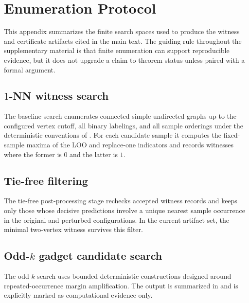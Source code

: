 \section{Enumeration Protocol}
\label{sec:enumeration-protocol}

This appendix summarizes the finite search spaces used to produce the witness
and certificate artifacts cited in the main text. The guiding rule throughout
the supplementary material is that finite enumeration can support reproducible evidence, but
it does not upgrade a claim to theorem status unless paired with a formal
argument.

\subsection[1-NN witness search]{$1$-NN witness search}

The baseline search enumerates connected simple undirected graphs up to the
configured vertex cutoff, all binary labelings, and all sample orderings under
the deterministic conventions of . For each candidate
sample it computes the fixed-sample maxima of the LOO and replace-one
indicators and records witnesses where the former is $0$ and the latter is $1$.

\subsection{Tie-free filtering}

The tie-free post-processing stage rechecks accepted witness records and keeps
only those whose decisive predictions involve a unique nearest sample occurrence
in the original and perturbed configurations. In the current artifact set, the
minimal two-vertex witness survives this filter.

\subsection[Odd-k gadget candidate search]{Odd-$k$ gadget candidate search}

The odd-$k$ search uses bounded deterministic constructions designed around
repeated-occurrence margin amplification. The output is summarized in
 and is explicitly marked as computational
evidence only.




